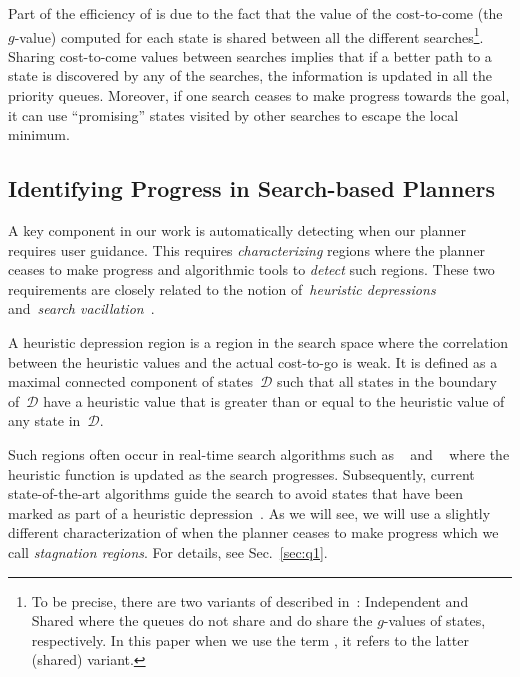 \documentclass{article}
\begin{document}
Part of the efficiency of \mhastar is due to the fact that the value of the cost-to-come (the $g$-value) computed for each state is shared between all the different searches\footnote{To be precise, there are two variants of \mhastar described in~\cite{ASNHL16}: Independent and Shared \mhastar where the queues do not share and do share the $g$-values of states, respectively. In this paper when we use the term \mhastar, it refers to the latter (shared) variant.}.
Sharing cost-to-come values between searches implies that if a better path to a state is discovered by any of the searches, the information is updated in all the
priority queues. 
Moreover, if one search ceases to make progress towards the goal, it can use ``promising'' states visited by other searches to escape the local minimum.

\subsection{Identifying Progress in Search-based Planners}

A key component in our work is automatically detecting when our planner requires user guidance.
This requires \emph{characterizing} regions where the planner ceases to make progress and algorithmic tools to \emph{detect} such regions. 
These two requirements are closely related to the notion of~\emph{heuristic depressions}~\cite{I92}
and~\emph{search vacillation}~\cite{DTR11,BRD13}.

A heuristic depression region is a  region in the search space where the correlation between the heuristic values and the actual cost-to-go is weak.
It is defined as a maximal connected component of states~$\mathcal{D}$ such that all states in the boundary of~$\mathcal{D}$ have a heuristic value that is greater than or equal to the heuristic value of any state in~$\mathcal{D}$.

Such regions often occur in real-time search algorithms such as ~\cite{K90} and ~\cite{KS09} where the heuristic function is updated as the search progresses.
Subsequently, current state-of-the-art algorithms  guide the search to avoid states that have been marked as part of a heuristic depression~\cite{HB12}.
As we will see, we will use a slightly different characterization of when the planner ceases to make progress which we call \emph{stagnation regions}. For details, see Sec.~\ref{sec:q1}. 
\end{document}

